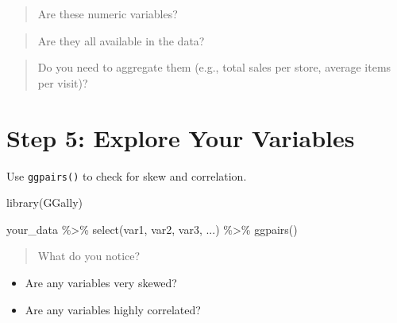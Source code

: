 \documentclass[
  11pt,
]{article}
\newenvironment{Shaded}{\begin{snugshade}}{\end{snugshade}}
\newcommand{\FunctionTok}[1]{\textcolor[rgb]{0.28,0.35,0.67}{#1}}
\newcommand{\NormalTok}[1]{\textcolor[rgb]{0.00,0.23,0.31}{#1}}
\newcommand{\SpecialCharTok}[1]{\textcolor[rgb]{0.37,0.37,0.37}{#1}}
\providecommand{\tightlist}{%
  \setlength{\itemsep}{0pt}\setlength{\parskip}{0pt}}\usepackage{longtable,booktabs,array}
\begin{document}
\begin{quote}
Are these numeric variables?
\end{quote}

\vspace{2em}

\begin{quote}
Are they all available in the data?
\end{quote}

\vspace{2em}

\begin{quote}
Do you need to aggregate them (e.g., total sales per store, average
items per visit)?
\end{quote}

\newpage

\section*{Step 5: Explore Your
Variables}\label{step-5-explore-your-variables}

Use \texttt{ggpairs()} to check for skew and correlation.

\begin{Shaded}
\begin{Highlighting}[]
\FunctionTok{library}\NormalTok{(GGally)}

\NormalTok{your\_data }\SpecialCharTok{\%\textgreater{}\%}
  \FunctionTok{select}\NormalTok{(var1, var2, var3, ...) }\SpecialCharTok{\%\textgreater{}\%}
  \FunctionTok{ggpairs}\NormalTok{()}
\end{Highlighting}
\end{Shaded}

\begin{quote}
What do you notice?
\end{quote}

\begin{itemize}
\tightlist
\item
  Are any variables very skewed?
\end{itemize}

\vspace{2em}

\begin{itemize}
\tightlist
\item
  Are any variables highly correlated?
\end{itemize}

\vspace{2em}
\end{document}
